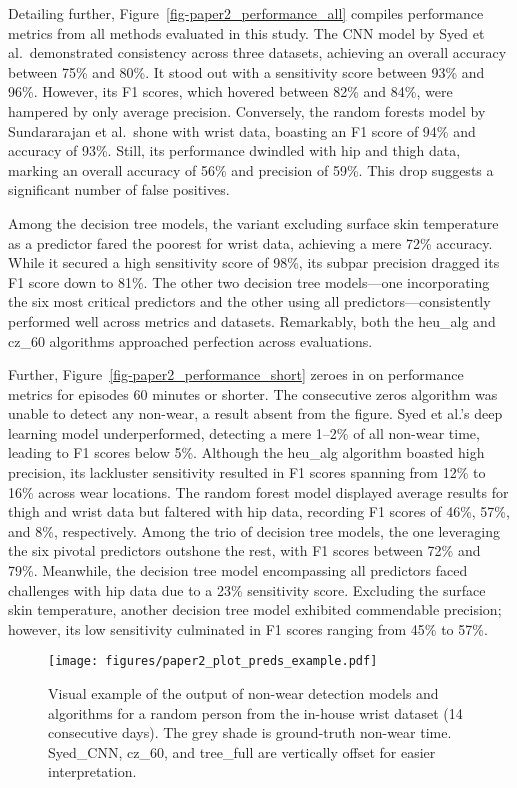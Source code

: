 \documentclass[
  9pt,
]{scrbook}
\begin{document}
Detailing further, Figure~\ref{fig-paper2_performance_all} compiles
performance metrics from all methods evaluated in this study. The CNN
model by Syed et al.~demonstrated consistency across three datasets,
achieving an overall accuracy between 75\% and 80\%. It stood out with a
sensitivity score between 93\% and 96\%. However, its F1 scores, which
hovered between 82\% and 84\%, were hampered by only average precision.
Conversely, the random forests model by Sundararajan et al.~shone with
wrist data, boasting an F1 score of 94\% and accuracy of 93\%. Still,
its performance dwindled with hip and thigh data, marking an overall
accuracy of 56\% and precision of 59\%. This drop suggests a significant
number of false positives.

Among the decision tree models, the variant excluding surface skin
temperature as a predictor fared the poorest for wrist data, achieving a
mere 72\% accuracy. While it secured a high sensitivity score of 98\%,
its subpar precision dragged its F1 score down to 81\%. The other two
decision tree models---one incorporating the six most critical
predictors and the other using all predictors---consistently performed
well across metrics and datasets. Remarkably, both the heu\_alg and
cz\_60 algorithms approached perfection across evaluations.

Further, Figure~\ref{fig-paper2_performance_short} zeroes in on
performance metrics for episodes 60 minutes or shorter. The consecutive
zeros algorithm was unable to detect any non-wear, a result absent from
the figure. Syed et al.'s deep learning model underperformed, detecting
a mere 1--2\% of all non-wear time, leading to F1 scores below 5\%.
Although the heu\_alg algorithm boasted high precision, its lackluster
sensitivity resulted in F1 scores spanning from 12\% to 16\% across wear
locations. The random forest model displayed average results for thigh
and wrist data but faltered with hip data, recording F1 scores of 46\%,
57\%, and 8\%, respectively. Among the trio of decision tree models, the
one leveraging the six pivotal predictors outshone the rest, with F1
scores between 72\% and 79\%. Meanwhile, the decision tree model
encompassing all predictors faced challenges with hip data due to a 23\%
sensitivity score. Excluding the surface skin temperature, another
decision tree model exhibited commendable precision; however, its low
sensitivity culminated in F1 scores ranging from 45\% to 57\%.

\begin{figure}

{\centering \texttt{[image: figures/paper2\_plot\_preds\_example.pdf]}

}

\caption{\label{fig-paper2_preds_ex}Visual example of the output of
non-wear detection models and algorithms for a random person from the
in-house wrist dataset (14 consecutive days). The grey shade is
ground-truth non-wear time. Syed\_CNN, cz\_60, and tree\_full are
vertically offset for easier interpretation.}

\end{figure}
\end{document}
